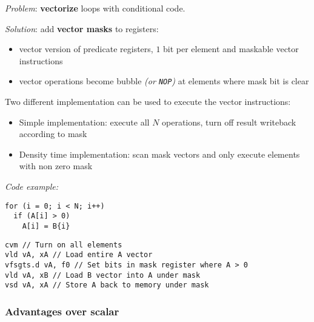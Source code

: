 \documentclass[english]{article}
\begin{document}
\textit{Problem}: \textbf{vectorize} loops with conditional code.

\textit{Solution}: add \textbf{vector masks} to registers:

\begin{itemize}
  \item vector version of predicate registers, \(1\) bit per element and maskable vector instructions
  \item vector operations become bubble \textit{(or \texttt{NOP})} at elements where mask bit is clear
\end{itemize}

Two different implementation can be used to execute the vector instructions:

\begin{itemize}
  \item Simple implementation: execute all \(N\) operations, turn off result writeback according to mask
  \item Density time implementation: scan mask vectors and only execute elements with non zero mask
\end{itemize}

\bigskip
\textit{Code example:}
\bigskip

\begin{minipage}{\textwidth}
  \begin{minipage}[t]{0.3\textwidth}
    \begin{verbatim}
for (i = 0; i < N; i++)
  if (A[i] > 0)
    A[i] = B{i}
    \end{verbatim}
  \end{minipage}
  \begin{minipage}[t]{0.695\textwidth}
    \begin{verbatim}
cvm // Turn on all elements
vld vA, xA // Load entire A vector
vfsgts.d vA, f0 // Set bits in mask register where A > 0
vld vA, xB // Load B vector into A under mask
vsd vA, xA // Store A back to memory under mask
    \end{verbatim}
  \end{minipage}
\end{minipage}

\subsubsection{Advantages over scalar}
\end{document}
